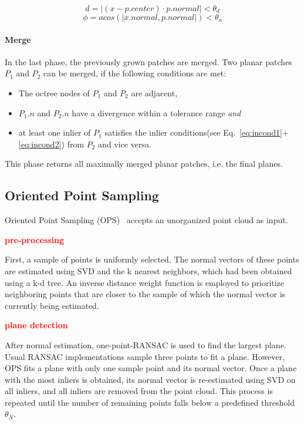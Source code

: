 \documentclass[main.tex]{subfiles}
\begin{document}
\begin{equation}
    \label{eq:incond1}
    d = |(x - p.center)\cdot p.normal| < \theta_d
\end{equation}
\begin{equation}
    \label{eq:incond2}
    \phi = acos(|x.normal, p.normal|) < \theta_a
\end{equation}

\paragraph*{Merge}
In the last phase, the previously grown patches are merged. Two planar patches $P_1$ and $P_2$ can be merged, if the following conditions are met:
\begin{itemize}
    \item The octree nodes of $P_1$ and $P_2$ are adjacent,
    \item $P_1.n$ and $P_2.n$ have a divergence within a tolerance range \textit{and}
    \item at least one inlier of $P_1$ satisfies the inlier conditions(see Eq.~\ref{eq:incond1}+\ref{eq:incond2}) from $P_2$ and vice versa.
\end{itemize}

This phase returns all maximally merged planar patches, i.e. the final planes.

\subsection{Oriented Point Sampling}
Oriented Point Sampling (OPS)~\cite{Sun_Mordohai_2019} accepts an unorganized point cloud as input.

\textbf{\textcolor{red}{pre-processing}}

First, a sample of points is uniformly selected. The normal vectors of these points are estimated using SVD and the k nearest neighbors, which had been obtained using a k-d tree.
An inverse distance weight function is employed to prioritize neighboring points that are closer to the sample of which the normal vector is currently being estimated.

\textbf{\textcolor{red}{plane detection}}

After normal estimation, one-point-RANSAC is used to find the largest plane. Usual RANSAC implementations sample three points to fit a plane. However, OPS fits a plane with only one sample point and its normal vector.
Once a plane with the most inliers is obtained, its normal vector is re-estimated using SVD on all inliers, and all inliers are removed from the point cloud.
This process is repeated until the number of remaining points falls below a predefined threshold $\theta_N$.
\end{document}

